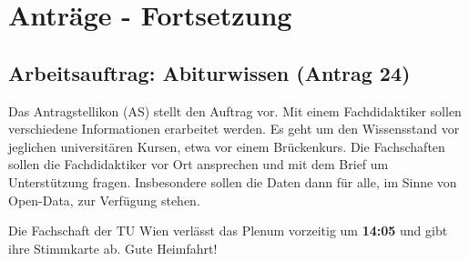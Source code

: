  \newpage
\section{Anträge - Fortsetzung}
  \subsection*{Arbeitsauftrag: Abiturwissen (Antrag 24)}
    Das Antragstellikon (AS) stellt den Auftrag vor.
    Mit einem Fachdidaktiker sollen verschiedene Informationen erarbeitet werden.
    Es geht um den Wissensstand vor jeglichen universitären Kursen, etwa vor einem Brückenkurs.
    Die Fachschaften sollen die Fachdidaktiker vor Ort ansprechen und mit dem Brief um Unterstützung fragen.
    Insbesondere sollen die Daten dann für alle, im Sinne von Open-Data, zur Verfügung stehen.

    \begin{info}{}
      Die Fachschaft der TU Wien verlässt das Plenum vorzeitig um \textbf{14:05} und gibt ihre Stimmkarte ab. Gute Heimfahrt!
    \end{info}

